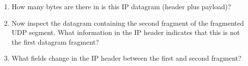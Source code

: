 \begin{enumerate}[label=\bfseries Problem \arabic*:,leftmargin=*,labelindent=1em]
        \soln
        \item How many bytes are there in is this IP datagram (header plus payload)?\\[0.2mm]
        \soln
        \item Now inspect the datagram containing the second fragment of the fragmented UDP segment. What information in the IP header indicates that this is not the first datagram fragment?\\[0.2mm]
        \soln
        \item What fields change in the IP header between the first and second fragment?\\[0.2mm]
        \soln
    \end{enumerate}
\newpage